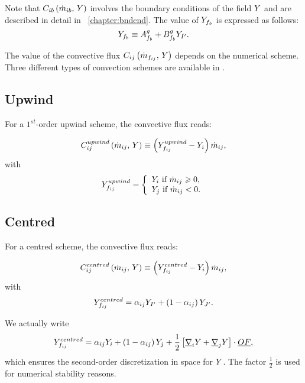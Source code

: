 Note that $C_{ib} \left( \dot{m}_{ib} , \, Y \right)$ involves the boundary conditions of the field $Y$
 and are described in detail in \chaptername~\ref{chapter:bndcnd}. The value of $Y_{f_{b}}$ is expressed as follows:
\begin{equation}%
\varia_\fib \equiv A_\fib^g + B_\fib^g \varia_\centip.
\end{equation}

The value of the convective flux $ C_{ij} \left(\dot{m}_{f_{ij}} , \, Y \right) $ depends on the numerical scheme. Three different types of convection schemes are available in \CS.

\subsection{Upwind}
For a $1^{st}$-order upwind scheme, the convective flux reads:

\begin{equation}
C_{ij}^{upwind} \left( \dot{m}_{ij} , \, Y \right)  \equiv \left(Y_{f_{ij}}^{upwind} - Y_i \right) \dot{m}_{ij},
\end{equation}
with
\begin{equation}
Y_{f_{ij}}^{upwind} =
\left\lbrace\begin{array}{l}
Y_i \text{ if } \dot{m}_{ij}  \geqslant 0,\\
Y_j \text{ if } \dot{m}_{ij} < 0.
\end{array}\right.
\end{equation}


\subsection{Centred}
For a centred scheme, the convective flux reads:

\begin{equation}
C_{ij}^{centred} \left( \dot{m}_{ij} , \, Y \right)  \equiv \left(Y_{f_{ij}}^{centred} - Y_i \right) \dot{m}_{ij} ,
\end{equation}
with
\begin{equation}
Y_{f_{ij}}^{centred} = \alpha_{ij} Y_{I^\prime} + \left( 1 - \alpha_{ij} \right) Y_{J^\prime}.
\end{equation}

\begin{remark}

We actually write
%
\begin{equation}
Y_{f_{ij}}^{centred} = \alpha_{ij} Y_i + \left( 1 - \alpha_{ij} \right) Y_j
+
\dfrac{1}{2} \left[ \underline{\nabla}_i Y + \underline{\nabla}_j Y \right] \cdot \underline{OF},
\end{equation}
%
which ensures the second-order discretization in space for $Y$.
The factor $ \frac{1}{2}$ is used for numerical stability reasons.
\end{remark}

